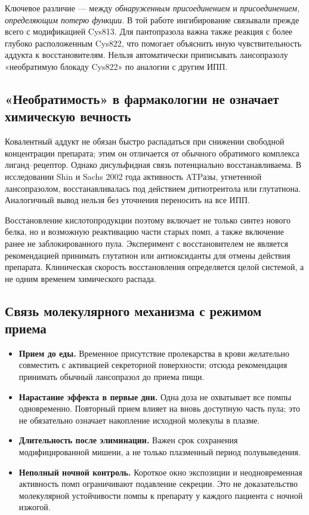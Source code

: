 \documentclass[11pt,a4paper,notitlepage]{report}
\newcommand{\src}[1]{\unskip\space\cite{#1}}
\begin{document}
Ключевое различие --- между \emph{обнаруженным присоединением} и \emph{присоединением, определяющим потерю функции}. В той работе ингибирование связывали прежде всего с модификацией Cys813. Для пантопразола важна также реакция с более глубоко расположенным Cys822, что помогает объяснить иную чувствительность аддукта к восстановителям. Нельзя автоматически приписывать лансопразолу «необратимую блокаду Cys822» по аналогии с другим ИПП.\src{molcys,molrestore}

\subsection{«Необратимость» в фармакологии не означает химическую вечность}
Ковалентный аддукт не обязан быстро распадаться при снижении свободной концентрации препарата; этим он отличается от обычного обратимого комплекса лиганд--рецептор. Однако дисульфидная связь потенциально восстанавливаема. В исследовании Shin и Sachs 2002 года активность ATPазы, угнетенной лансопразолом, восстанавливалась под действием дитиотреитола или глутатиона. Аналогичный вывод нельзя без уточнения переносить на все ИПП.\src{molrestore}

Восстановление кислотопродукции поэтому включает не только синтез нового белка, но и возможную реактивацию части старых помп, а также включение ранее не заблокированного пула. Эксперимент с восстановителем не является рекомендацией принимать глутатион или антиоксиданты для отмены действия препарата. Клиническая скорость восстановления определяется целой системой, а не одним временем химического распада.\src{molrestore,agadepres}

\subsection{Связь молекулярного механизма с режимом приема}
\begin{itemize}
\item \textbf{Прием до еды.} Временное присутствие пролекарства в крови желательно совместить с активацией секреторной поверхности; отсюда рекомендация принимать обычный лансопразол до приема пищи.\src{acggerd,molezrin}
\item \textbf{Нарастание эффекта в первые дни.} Одна доза не охватывает все помпы одновременно. Повторный прием влияет на вновь доступную часть пула; это не обязательно означает накопление исходной молекулы в плазме.\src{pharmalabel}
\item \textbf{Длительность после элиминации.} Важен срок сохранения модифицированной мишени, а не только плазменный период полувыведения.\src{molrestore}
\item \textbf{Неполный ночной контроль.} Короткое окно экспозиции и неодновременная активность помп ограничивают подавление секреции. Это не доказательство молекулярной устойчивости помпы к препарату у каждого пациента с ночной изжогой.\src{acggerd}
\end{itemize}
\end{document}
